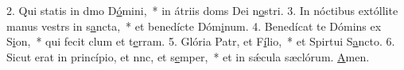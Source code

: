 2. Qui statis in dmo D\uline{ó}mini,~* in átriis doms Dei n\uline{o}stri.
3. In nóctibus extóllite manus vestrs in s\uline{a}ncta,~* et benedícte Dóm\uline{i}num.
4. Benedícat te Dómins ex S\uline{i}on,~* qui fecit clum et t\uline{e}rram.
5. Glória Patr, et F\uline{í}lio,~* et Spirtui S\uline{a}ncto.
6. Sicut erat in princípio, et nnc, et s\uline{e}mper,~* et in sǽcula sæclórum. \uline{A}men.
